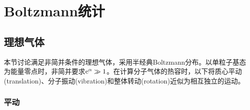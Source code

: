 \chapter{Boltzmann统计}

\section{理想气体}
\label{sec:ideal gas}

本节讨论满足非简并条件的理想气体，采用半经典Boltzmann分布。以单粒子基态为能量零点时，非简并要求$\mathop{}\!\mathrm{e}^\alpha \gg 1$。在计算分子气体的热容时，以下将质心平动(translation)、分子振动(vibration)和整体转动(rotation)近似为相互独立的运动。

\subsection{平动}
\label{ssec:translation}

